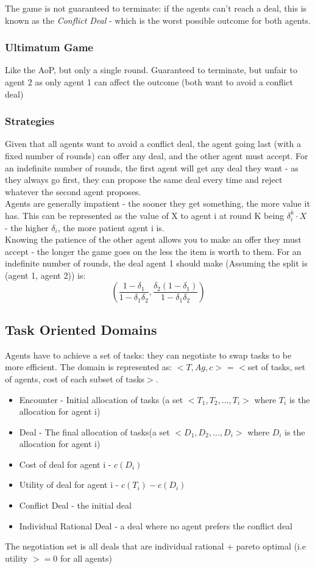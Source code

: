 The game is not guaranteed to terminate: if the agents can't reach a deal, this is known as the \emph{Conflict Deal} - which is the worst possible outcome for both agents. 

\subsubsection{Ultimatum Game}
Like the AoP, but only a single round. Guaranteed to terminate, but unfair to agent 2 as only agent 1 can affect the outcome (both want to avoid a conflict deal)

\subsubsection{Strategies}
Given that all agents want to avoid a conflict deal, the agent going last (with a fixed number of rounds) can offer any deal, and the other agent must accept. For an indefinite number of rounds, the first agent will get any deal they want - as they always go first, they can propose the same deal every time and reject whatever the second agent proposes. \\

Agents are generally impatient - the sooner they get something, the more value it has. This can be represented as the value of X to agent i at round K being $\delta^k_i \cdot X$ - the higher $\delta_i$, the more patient agent i is.\\
Knowing the patience of the other agent allows you to make an offer they must accept - the longer the game goes on the less the item is worth to them. For an indefinite number of rounds, the deal agent 1 should make (Assuming the split is (agent 1, agent 2)) is:
\[
    \left( \frac{1-\delta_1}{1-\delta_1\delta_2},\frac{\delta_2(1-\delta_1)}{1-\delta_1\delta_2} \right)
\]

\subsection{Task Oriented Domains}
Agents have to achieve a set of tasks: they can negotiate to swap tasks to be more efficient. The domain is represented as: \textbf{$<T,Ag,c>$} = $<$set of tasks, set of agents, cost of each subset of tasks$>$. 
\begin{itemize}
    \item Encounter - Initial allocation of tasks (a set $<T_1,T_2,...,T_i>$ where $T_i$ is the allocation for agent i)
    \item Deal - The final allocation of tasks(a set $<D_1,D_2,...,D_i>$ where $D_i$ is the allocation for agent i)
    \item Cost of deal for agent i - $c(D_i)$
    \item Utility of deal for agent i - $c(T_i) - c(D_i)$
    \item Conflict Deal - the initial deal
    \item Individual Rational Deal - a deal where no agent prefers the conflict deal
\end{itemize}
The negotiation set is all deals that are individual rational + pareto optimal (i.e utility $>= 0$ for all agents)

